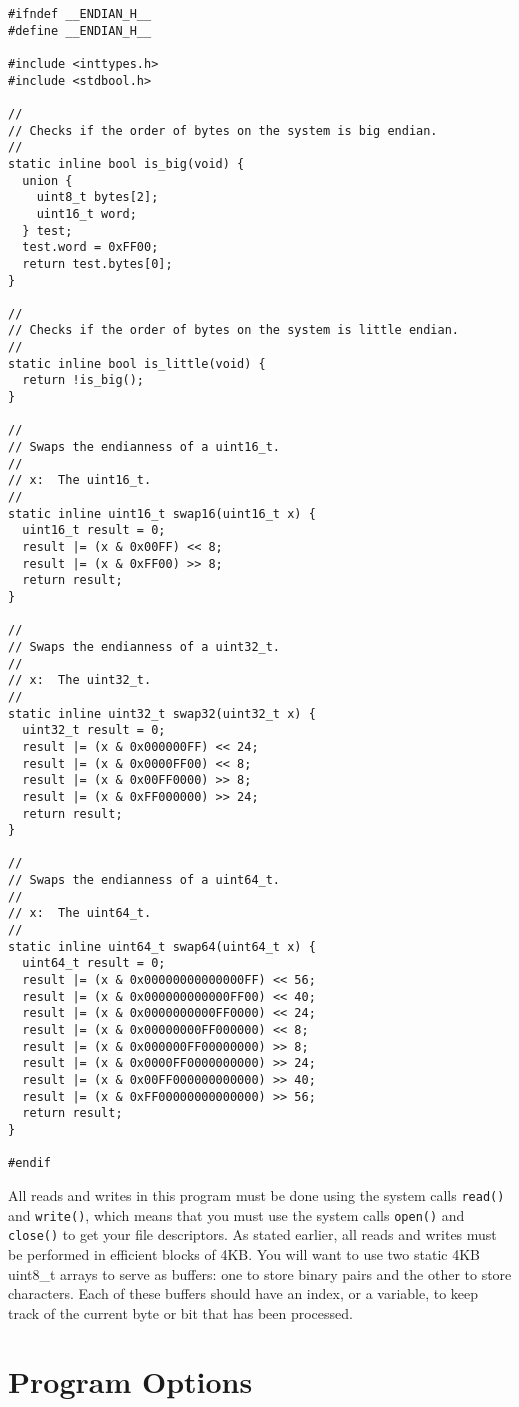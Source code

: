 \documentclass{article}
\begin{document}
\begin{lstlisting}[title=endian.h]
#ifndef __ENDIAN_H__
#define __ENDIAN_H__

#include <inttypes.h>
#include <stdbool.h>

//
// Checks if the order of bytes on the system is big endian.
//
static inline bool is_big(void) {
  union {
    uint8_t bytes[2];
    uint16_t word;
  } test;
  test.word = 0xFF00;
  return test.bytes[0];
}

//
// Checks if the order of bytes on the system is little endian.
//
static inline bool is_little(void) {
  return !is_big();
}

//
// Swaps the endianness of a uint16_t.
//
// x:  The uint16_t.
//
static inline uint16_t swap16(uint16_t x) {
  uint16_t result = 0;
  result |= (x & 0x00FF) << 8;
  result |= (x & 0xFF00) >> 8;
  return result;
}

//
// Swaps the endianness of a uint32_t.
//
// x:  The uint32_t.
//
static inline uint32_t swap32(uint32_t x) {
  uint32_t result = 0;
  result |= (x & 0x000000FF) << 24;
  result |= (x & 0x0000FF00) << 8;
  result |= (x & 0x00FF0000) >> 8;
  result |= (x & 0xFF000000) >> 24;
  return result;
}

//
// Swaps the endianness of a uint64_t.
//
// x:  The uint64_t.
//
static inline uint64_t swap64(uint64_t x) {
  uint64_t result = 0;
  result |= (x & 0x00000000000000FF) << 56;
  result |= (x & 0x000000000000FF00) << 40;
  result |= (x & 0x0000000000FF0000) << 24;
  result |= (x & 0x00000000FF000000) << 8;
  result |= (x & 0x000000FF00000000) >> 8;
  result |= (x & 0x0000FF0000000000) >> 24;
  result |= (x & 0x00FF000000000000) >> 40;
  result |= (x & 0xFF00000000000000) >> 56;
  return result;
}

#endif
\end{lstlisting}

All reads and writes in this program must be done using the system calls
\texttt{read()} and \texttt{write()}, which means that you must use the system
calls \texttt{open()} and \texttt{close()} to get your file descriptors. As
stated earlier, all reads and writes must be performed in efficient blocks of
4KB. You will want to use two static 4KB uint8\_t arrays to serve as buffers:
one to store binary pairs and the other to store characters. Each of these
buffers should have an index, or a variable, to keep track of the current byte
or bit that has been processed.

\section{Program Options}
\end{document}
